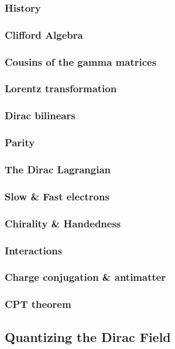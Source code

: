\documentclass{book}
\theoremstyle{definition}
\begin{document}
\subsubsection{History}
\subsubsection{Clifford Algebra}
\subsubsection{Cousins of the gamma matrices}
\subsubsection{Lorentz transformation}
\subsubsection{Dirac bilinears}
\subsubsection{Parity}
\subsubsection{The Dirac Lagrangian}
\subsubsection{Slow \& Fast electrons}
\subsubsection{Chirality \& Handedness}
\subsubsection{Interactions}
\subsubsection{Charge conjugation \& antimatter}
\subsubsection{CPT theorem}




\newpage


\subsection{Quantizing the Dirac Field}
\end{document}

